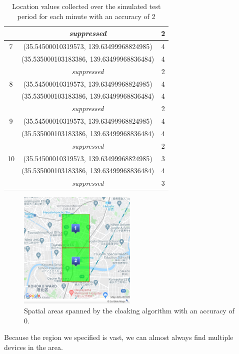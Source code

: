 \begin{table}[htbp]
\begin{tabular}{|c|c|c|}
        &\textit{suppressed} & 2 \\ 
        \hline
        7 & (35.54500010319573, 139.63499968824985) & 4 \\ 
        & (35.535000103183386, 139.63499968836484) & 4 \\ 
        &\textit{suppressed} & 2 \\ 
        \hline
        8 & (35.54500010319573, 139.63499968824985) & 4 \\ 
        & (35.535000103183386, 139.63499968836484) & 4 \\ 
        &\textit{suppressed} & 2 \\  
        \hline
        9 & (35.54500010319573, 139.63499968824985) & 4 \\ 
        & (35.535000103183386, 139.63499968836484) & 4 \\ 
        &\textit{suppressed} & 2 \\ 
        \hline
        10 & (35.54500010319573, 139.63499968824985) & 3 \\ 
        & (35.535000103183386, 139.63499968836484) & 4 \\ 
        &\textit{suppressed} & 3 \\ 
        \hline
    \end{tabular}
    \caption{Location values collected over the simulated test period for each minute with an accuracy of 2}
    \label{tab:location_sim2}
\end{table}

\begin{figure}[htbp]
  \centering
  \includegraphics[width=0.5\textwidth]{figures/acc2}
  \caption{Spatial areas spanned by the cloaking algorithm with an accuracy of 0.} \label{fig:acc2}
\end{figure}

Because the region we specified is vast, we can almost always find multiple devices in the area.


